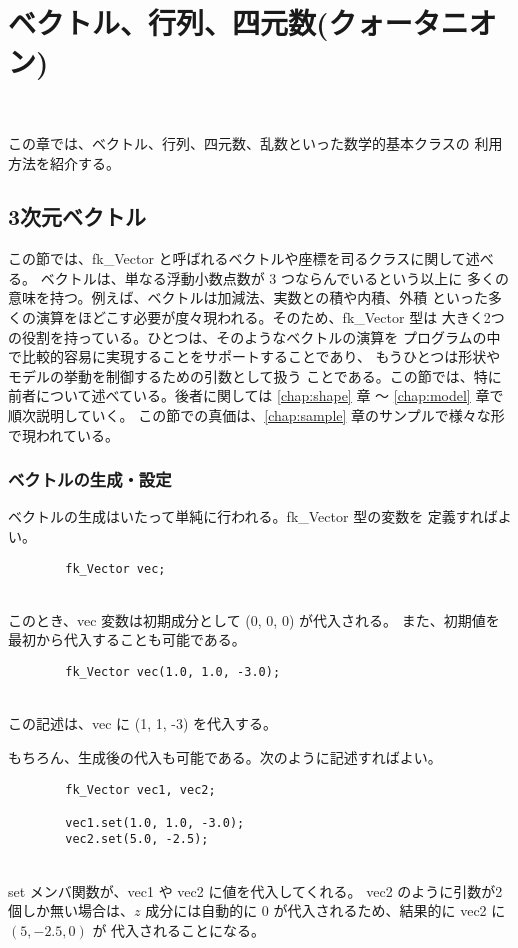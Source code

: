 \chapter{ベクトル、行列、四元数(クォータニオン)} \label{chap:math} ~

この章では、ベクトル、行列、四元数、乱数といった数学的基本クラスの
利用方法を紹介する。

\section{3次元ベクトル}
この節では、fk\_Vector と呼ばれるベクトルや座標を司るクラスに関して述べる。
ベクトルは、単なる浮動小数点数が 3 つならんでいるという以上に
多くの意味を持つ。例えば、ベクトルは加減法、実数との積や内積、外積
といった多くの演算をほどこす必要が度々現われる。そのため、fk\_Vector 型は
大きく2つの役割を持っている。ひとつは、そのようなベクトルの演算を
プログラムの中で比較的容易に実現することをサポートすることであり、
もうひとつは形状やモデルの挙動を制御するための引数として扱う
ことである。この節では、特に前者について述べている。後者に関しては
\ref{chap:shape} 章 〜 \ref{chap:model} 章で順次説明していく。
この節での真価は、\ref{chap:sample} 章のサンプルで様々な形で現われている。

\subsection{ベクトルの生成・設定}
ベクトルの生成はいたって単純に行われる。fk\_Vector 型の変数を
定義すればよい。
\\
\begin{screen}
\begin{verbatim}
        fk_Vector vec;
\end{verbatim}
\end{screen}
~ \\
このとき、vec 変数は初期成分として (0, 0, 0) が代入される。
また、初期値を最初から代入することも可能である。
\\
\begin{screen}
\begin{verbatim}
        fk_Vector vec(1.0, 1.0, -3.0);
\end{verbatim}
\end{screen}
~ \\
この記述は、vec に (1, 1, -3) を代入する。

もちろん、生成後の代入も可能である。次のように記述すればよい。
\\
\begin{screen}
\begin{verbatim}
        fk_Vector vec1, vec2;

        vec1.set(1.0, 1.0, -3.0);
        vec2.set(5.0, -2.5);
\end{verbatim}
\end{screen}
~ \\
set メンバ関数が、vec1 や vec2 に値を代入してくれる。
vec2 のように引数が2個しか無い場合は、\(z\) 成分には自動的に
\(0\) が代入されるため、結果的に vec2 に \((5, -2.5, 0)\) が
代入されることになる。

